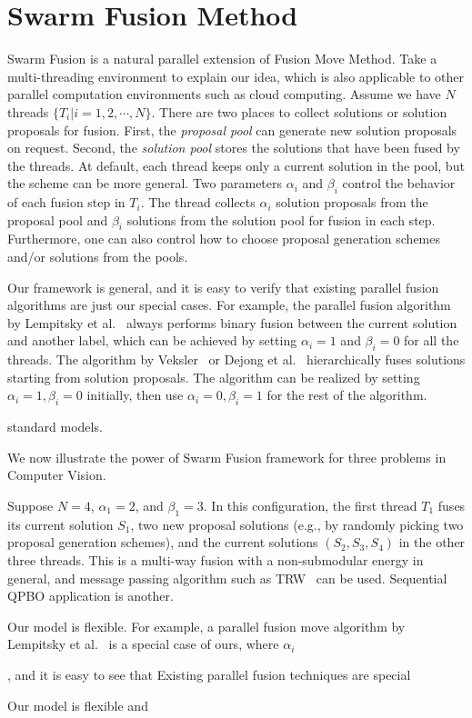 \section{Swarm Fusion Method}
  Swarm Fusion is a natural
parallel extension of Fusion Move Method. Take a multi-threading
environment to explain our idea, which is also applicable to other
parallel computation environments such as cloud computing. Assume we
have $N$ threads $\{T_i | i=1, 2, \cdots, N\}$. There are two places to
collect solutions or solution proposals for fusion. First, the {\it
proposal pool} can generate new solution proposals on request.
%
Second, the {\it solution pool} stores the solutions that have been
fused by the threads. At default, each thread keeps only a current
solution in the pool, but the scheme can be more general. Two
parameters $\alpha_i$ and $\beta_i$ control the behavior of each fusion
step in $T_i$. The thread collects $\alpha_i$ solution proposals
from the proposal pool and $\beta_i$ solutions from the solution pool
for fusion in each step.
%
Furthermore, one can also control how to choose proposal generation
schemes and/or solutions from the pools.


Our framework is general, and it is easy to verify that existing
parallel fusion algorithms are just our special cases.
%
For example, the parallel fusion algorithm by Lempitsky et
al.~\cite{viktor} always performs binary fusion between the current
solution and another label, which can be achieved by setting $\alpha_i =
1$ and $\beta_i = 0$ for all the threads. The algorithm by
Veksler~\cite{olga} or Dejong et al.~\cite{dejong} hierarchically fuses
solutions starting from solution proposals. The algorithm can be
realized by setting $\alpha_i = 1, \beta_i = 0$ initially, then use
$\alpha_i = 0, \beta_i=1$  for the rest of the algorithm.



standard models.



We now illustrate the power of Swarm Fusion framework for three problems
in Computer Vision. 


Suppose $N=4$, $\alpha_1 = 2$, and $\beta_1 = 3$. In this
configuration, the first thread $T_1$ fuses its current solution $S_1$,
two new proposal solutions (e.g., by randomly picking two proposal
generation schemes), and the current solutions $(S_2, S_3, S_4)$ in the
other three threads. This is a multi-way fusion with a non-submodular
energy in general, and message passing algorithm such as
TRW~\cite{kolmogorov} can be used. Sequential QPBO application is
another.


Our model is flexible. For example, a parallel fusion move algorithm by
Lempitsky et al.~\cite{viktor} is a special case of ours, where $\alpha_i$

, and it is easy to see that 
Existing parallel fusion techniques are special 

Our model is flexible and 
